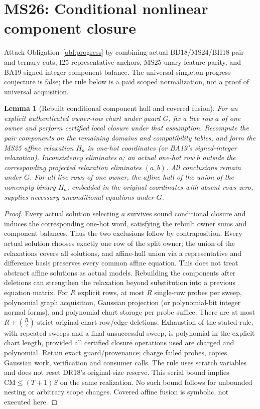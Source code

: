 \documentclass[11pt]{article}
\newtheorem{lemma}[theorem]{Lemma}
\begin{document}
\section{MS26: Conditional nonlinear component closure}\label{sec:ms26}
Attack Obligation~\ref{obl:progress} by combining actual BD18/MS24/BH18 pair and ternary cuts, I25 representative anchors, MS25 unary feature parity, and BA19 signed-integer component balance. The universal singleton progress conjecture is false; the rule below is a paid scoped normalization, not a proof of universal acquisition.
\begin{lemma}[Rebuilt conditional component hull and covered fusion]\label{lem:ms26-probe}
For an explicit authenticated owner-row chart under guard $G$, fix a live row $a$ of one owner and perform certified local closure under that assumption. Recompute the pair components on the remaining domains and compatibility tables, and form the MS25 affine relaxation $H_a$ in one-hot coordinates (or BA19's signed-integer relaxation). Inconsistency eliminates $a$; an actual one-hot row $b$ outside the corresponding projected relaxation eliminates $(a,b)$. All conclusions remain under $G$. For all live rows of one owner, the affine hull of the union of the nonempty binary $H_a$, embedded in the original coordinates with absent rows zero, supplies necessary unconditional equations under $G$.
\end{lemma}
\begin{proof}
Every actual solution selecting $a$ survives sound conditional closure and induces the corresponding one-hot word, satisfying the rebuilt owner sums and component balances. Thus the two exclusions follow by contraposition. Every actual solution chooses exactly one row of the split owner; the union of the relaxations covers all solutions, and affine-hull union via a representative and difference basis preserves every common affine equation. This does not treat abstract affine solutions as actual models. Rebuilding the components after deletions can strengthen the relaxation beyond substitution into a previous equation matrix.
For $R$ explicit rows, at most $R$ single-row probes per sweep, polynomial graph acquisition, Gaussian projection (or polynomial-bit integer normal forms), and polynomial chart storage per probe suffice. There are at most $R+\binom R2$ strict original-chart row/edge deletions. Exhaustion of the stated rule, with repeated sweeps and a final unsuccessful sweep, is polynomial in the explicit chart length, provided all certified closure operations used are charged and polynomial. Retain exact guard/provenance; charge failed probes, copies, Gaussian work, verification and consumer calls. The rule uses scratch variables and does not reset DR18's original-size reserve. This serial bound implies $\mathrm{CM}\le(T+1)S$ on the same realization. No such bound follows for unbounded nesting or arbitrary scope changes. Covered affine fusion is symbolic, not executed here.
\end{proof}
\end{document}
